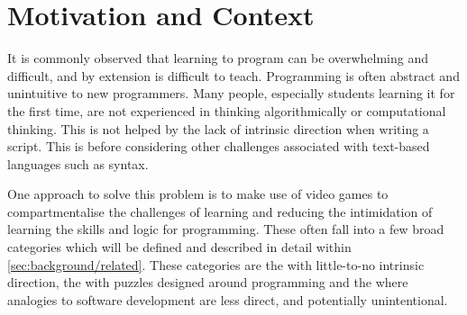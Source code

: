 %



\section{Motivation and Context}\label{sec:introduction/motivation_and_context}

It is commonly observed that learning to program can be overwhelming and difficult, and by extension is difficult to teach. Programming is often abstract and unintuitive to new programmers. Many people, especially students learning it for the first time, are not experienced in thinking algorithmically or computational thinking. This is not helped by the lack of intrinsic direction when writing a script. This is before considering other challenges associated with text-based languages such as syntax.

One approach to solve this problem is to make use of video games to compartmentalise the challenges of learning and reducing the intimidation of learning the skills and logic for programming. These often fall into a few broad categories which will be defined and described in detail within \autoref{sec:background/related}. These categories are the  with little-to-no intrinsic  direction, the  with puzzles designed around programming and the  where analogies to software development are less direct, and potentially unintentional.

